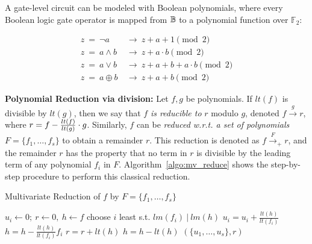 A gate-level circuit can be modeled with Boolean polynomials, where
every Boolean logic gate operator is mapped from ${\mathbb{B}}$ to a polynomial
function over ${\mathbb{F}}_2$: 

{\small
\begin{equation}
\label{b2poly}
\begin{split}
z ~ =  ~ \neg a ~ & \rightarrow ~ z+a+1 \pmod 2  \\
z ~ =  ~ a \wedge b ~ & \rightarrow ~ z+a\cdot b \pmod 2\\
z ~ =  ~ a \vee b ~ & \rightarrow ~ z+a+b+a\cdot b \pmod 2 \\
z ~ =  ~ a \oplus b ~ & \rightarrow ~ z+a+b \pmod 2 
\end{split}
\end{equation}
}


{\bf Polynomial Reduction via division:} Let $f, g$ be polynomials. If $lt(f)$ is divisible by
$lt(g)$, then we say that $f$ {\it is reducible to} $r$ modulo $g$,
denoted $f \stackrel{g}{\textstyle\longrightarrow} r$, where $r = f - {lt(f)   \over
  lt(g)} \cdot g$. Similarly, $f$ can be {\it reduced 
w.r.t. a set of polynomials}  $F = \{f_1, \dots, f_s\}$ to obtain a
remainder $r$. This reduction is denoted as $f \stackrel{F} {\textstyle
  \longrightarrow}_+ r$, and the remainder $r$ has the property that
no term in $r$ is divisible by the leading term of any polynomial
$f_i$ in $F$. Algorithm~\ref{algo:mv_reduce} shows the step-by-step procedure to perform this 
classical reduction.  

\begin{algorithm}[H]
 \caption{Multivariate Reduction of $f$ by $F=\{f_1,\dots,f_s\}$}
 \label{algo:mv_reduce}
 \begin{algorithmic}[1]
 \State $u_i \gets 0; ~r \gets 0, ~h \gets f $ 
 \State choose $i$ least s.t. $lm(f_i) ~|~ lm(h)$
 \State $u_i = u_i + \frac{lt(h)}{lt(f_i)}$
 \State $h = h - \frac{lt(h)}{lt(f_i)} f_i$
 \Else
 \State $r = r+ lt(h)$
 \State $h = h - lt(h)$
 \EndIf
 \EndWhile
 \State \Return $(\{u_1,\dots,u_s\} , r)$
 \EndProcedure
 \end{algorithmic}
 \end{algorithm}

